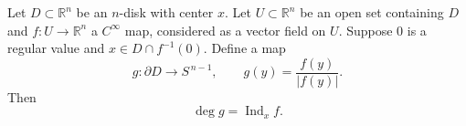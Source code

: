 Let $D \subset \mathbb{R}^{n}$ be an $n$-disk with center $x$. Let $U \subset \mathbb{R}^{n}$ be an open set containing $D$ and $f \colon U \to \mathbb{R}^{n}$ a $C^{\infty}$ map, considered as a vector field on $U$. Suppose $0$ is a regular value and $x \in D \cap f^{-1}(0)$. Define a map
$$
g \colon \partial D \to S^{\,n-1}, \qquad g(y) = \frac{f(y)}{|f(y)|}.
$$
Then
$$
\deg g = \operatorname{Ind}_{x} f.
$$
